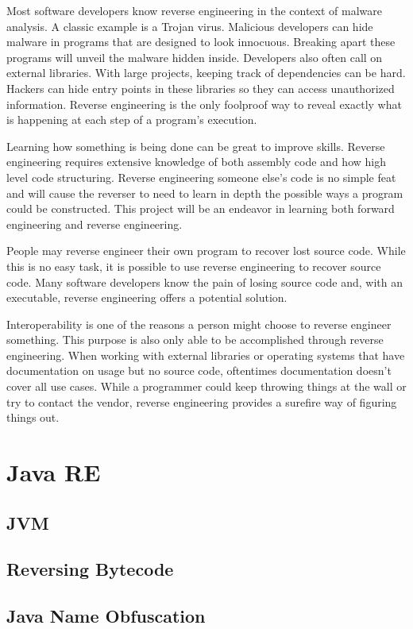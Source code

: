  Most software developers know reverse engineering in the context of malware analysis. 
 A classic example is a Trojan virus. Malicious developers can hide malware in programs that are designed to look innocuous. 
 Breaking apart these programs will unveil the malware hidden inside. Developers also often call on external libraries. 
 With large projects, keeping track of dependencies can be hard. Hackers can hide entry points in these libraries so they can access unauthorized information. 
 Reverse engineering is the only foolproof way to reveal exactly what is happening at each step of a program’s execution.

Learning how something is being done can be great to improve skills. 
Reverse engineering requires extensive knowledge of both assembly code and how high level code structuring. 
Reverse engineering someone else's code is no simple feat and will cause the reverser to need to learn in depth the possible ways a program could be constructed. 
This project will be an endeavor in learning both forward engineering and reverse engineering.  

People may reverse engineer their own program to recover lost source code. 
While this is no easy task, it is possible to use reverse engineering to recover source code. 
Many software developers know the pain of losing source code and, with an executable, reverse engineering offers a potential solution.

Interoperability is one of the reasons a person might choose to reverse engineer something. 
This purpose is also only able to be accomplished through reverse engineering. 
When working with external libraries or operating systems that have documentation on usage but no source code, oftentimes documentation doesn’t cover all use cases. 
While a programmer could keep throwing things at the wall or try to contact the vendor, reverse engineering provides a surefire way of figuring things out.

\section{Java RE}
\subsection{JVM}
\subsection{Reversing Bytecode}
\subsection{Java Name Obfuscation}
